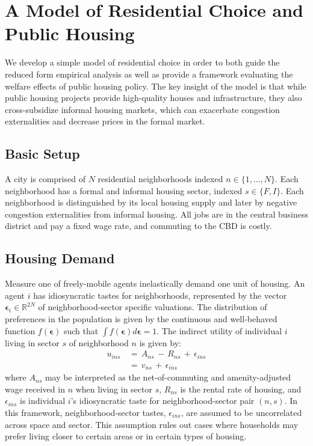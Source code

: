 \documentclass[12pt]{article}
\begin{document}
\section{A Model of Residential Choice and Public Housing}\label{section:model}

We develop a simple model of residential choice in order to both guide the reduced form empirical analysis as well as provide a framework evaluating the welfare effects of public housing policy.  The key insight of the model is that while public housing projects provide high-quality houses and infrastructure, they also cross-subsidize informal housing markets, which can exacerbate congestion externalities and decrease prices in the formal market.

\subsection*{Basic Setup}
A city is comprised of $N$ residential neighborhoods indexed $n\in\{1,...,N\}$.  Each neighborhood has a formal and informal housing sector, indexed $s\in\{F,I\}$.  Each neighborhood is distinguished by its local housing supply and later by negative congestion externalities from informal housing.  All jobs are in the central business district and pay a fixed wage rate, and commuting to the CBD is costly.

\subsection*{Housing Demand}

Measure one of freely-mobile agents inelastically demand one unit of housing. An agent $i$ has idiosyncratic tastes for neighborhoods, represented by the vector $\bm{\epsilon}_i \in \mathbb{R}^{2N}$ of neighborhood-sector specific valuations. The distribution of preferences in the population is given by the continuous and well-behaved function $f(\bm{\epsilon})$ such that $\int f(\bm{\epsilon}) d\bm{\epsilon} = 1$.
The indirect utility of individual $i$ living in sector $s$ of neighborhood $n$ is given by:
\begin{equation*}
\begin{aligned}
u_{ins} \,& =\, A_{ns}\,-\, R_{ns} \,+\, \epsilon_{ins} \\
        \,& =\, v_{ns} \,+\, \epsilon_{ins}
\end{aligned}
\end{equation*}
 where $A_{ns}$ may be interpreted as the net-of-commuting and amenity-adjusted wage received in $n$ when living in sector $s$, $R_{ns}$ is the rental rate of housing, and $\epsilon_{ins}$ is individual $i$'s idiosyncratic taste for neighborhood-sector pair $(n,s)$.  In this framework, neighborhood-sector tastes, $\epsilon_{ins}$, are assumed to be uncorrelated across space and sector.  This assumption rules out cases where households may prefer living closer to certain areas or in certain types of housing.
\end{document}
